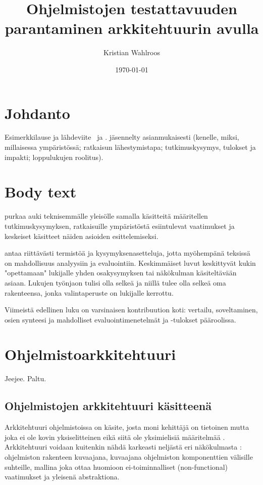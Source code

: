 \documentclass[finnish]{tktltiki2}
\title{Ohjelmistojen testattavuuden parantaminen arkkitehtuurin avulla}
\author{Kristian Wahlroos}
\date{\today}
\theoremstyle{definition}
\theoremstyle{remark}
\begin{document}

\frontmatter      %

\maketitle        %
\makeabstract     %

\tableofcontents  %


\mainmatter       %

\section{Johdanto}


Esimerkkilause ja lähdeviite~\cite{esimerkki} ja \cite{esimerkki2}.
jäsennelty asianmukaisesti (kenelle, miksi, millaisessa ympäristössä; ratkaisun lähestymistapa; tutkimuskysymys, tulokset ja impakti; loppulukujen roolitus).



\section{Body text}
purkaa auki teknisemmälle yleisölle samalla käsitteitä määritellen tutkimuskysymyksen, ratkaisuille ympäristöstä esiintulevat vaatimukset ja keskeiset käsitteet näiden asioiden esittelemiseksi.

antaa riittävästi termistöä ja kysymyksenasetteluja, jotta myöhempänä teksissä on mahdollisuus analyysiin ja evaluointiin.
Keskimmäiset luvut keskittyvät kukin "opettamaan" lukijalle yhden osakysymyksen tai näkökulman käsiteltävään asiaan. Lukujen työnjaon tulisi olla selkeä ja niillä tulee olla selkeä oma rakenteensa, jonka valintaperuste on lukijalle kerrottu.

Viimeistä edellinen luku on varsinaisen kontribuution koti: vertailu, soveltaminen, osien synteesi ja mahdolliset evaluointimenetelmät ja -tulokset pääroolissa.

\section{Ohjelmistoarkkitehtuuri}
Jeejee. Paltu.

\subsection{Ohjelmistojen arkkitehtuuri käsitteenä}
Arkkitehtuuri ohjelmistoissa on käsite, josta moni kehittäjä on tietoinen mutta joka ei ole kovin yksiselitteinen eikä siitä ole yksimielisiä määritelmää \cite{solms_what_2012}. Arkkitehtuuri voidaan kuitenkin nähdä karkeasti neljästä eri näkökulmasta  \citep[s. 2-7]{gorton_understanding_2011}:  ohjelmiston rakenteen kuvaajana, kuvaajana ohjelmiston komponenttien välisille suhteille, mallina joka ottaa huomioon ei-toiminnalliset (non-functional) vaatimukset ja yleisenä abstraktiona. 
\end{document}
